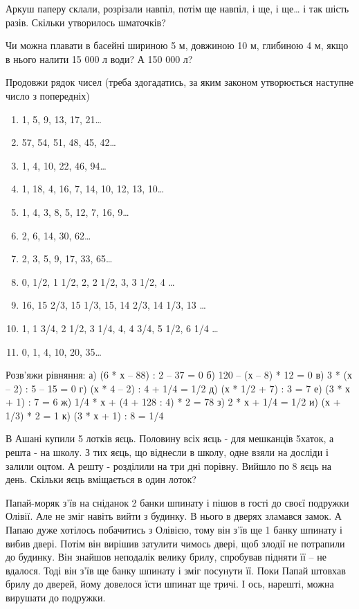 \problem
Аркуш паперу склали, розрізали навпіл, потім ще навпіл, і ще, і ще\ldots
і так шість разів.
Скільки утворилось шматочків?


\problem
Чи можна плавати в басейні шириною 5 м, довжиною 10 м, глибиною 4 м,
якщо в нього налити 15 000 л води? А 150 000 л?


\problem
Продовжи рядок чисел (треба здогадатись, за яким законом утворюється
наступне число з попередніх)
\begin{enumerate}
    \item 1, 5, 9, 13, 17, 21…
    \item 57, 54, 51, 48, 45, 42…
    \item 1, 4, 10, 22, 46, 94…
    \item 1, 18, 4, 16, 7, 14, 10, 12, 13, 10…
    \item 1, 4, 3, 8, 5, 12, 7, 16, 9…
    \item 2, 6, 14, 30, 62…
    \item 2, 3, 5, 9, 17, 33, 65…
    \item 0, 1/2, 1 1/2, 2, 2 1/2, 3, 3 1/2, 4 …
    \item 16, 15 2/3, 15 1/3, 15, 14 2/3, 14 1/3, 13 …
    \item 1, 1 3/4, 2 1/2, 3 1/4, 4, 4 3/4, 5 1/2, 6 1/4 …
    \item 0, 1, 4, 10, 20, 35… 
\end{enumerate}


\problem
Розв’яжи рівняння:
а) (6 * х – 88) : 2 – 37 = 0
б) 120 – (х – 8) * 12 = 0
в) 3 * (х – 2) : 5 – 15 = 0
г) (х * 4 – 2) : 4 + 1/4 = 1/2
д) (х * 1/2 + 7) : 3 = 7
е) (3 * х + 1) : 7 = 6
ж) 1/4 * х + (4 + 128 : 4) * 2 = 78
з) 2 * х + 1/4 = 1/2 
и) (х + 1/3) * 2 = 1
к) (3 * х + 1) : 8 = 1/4


\problem
В Ашані купили 5 лотків яєць.
Половину всіх яєць - для мешканців 5хаток, а решта - на школу.
З тих яєць, що віднесли в школу, одне взяли на досліди і залили оцтом.
А решту - розділили на три дні порівну. Вийшло по 8 яєць на день.
Скільки яєць вміщається в один лоток? 


\problem
Папай-моряк з’їв на сніданок 2 банки шпинату і пішов в гості до своєї
подружки Олівії. Але не зміг навіть вийти з будинку. В нього в дверях
зламався замок. А Папаю дуже хотілось побачитись з Олівією, тому він
з’їв ще 1 банку шпинату і вибив двері. Потім він вирішив затулити
чимось двері, щоб злодії не потрапили до будинку. Він знайшов неподалік
велику брилу, спробував підняти її – не вдалося. Тоді він з’їв ще банку
шпинату і зміг посунути її. Поки Папай штовхав брилу до дверей, йому
довелося їсти шпинат ще тричі. І ось, нарешті, можна вирушати до подружки.

